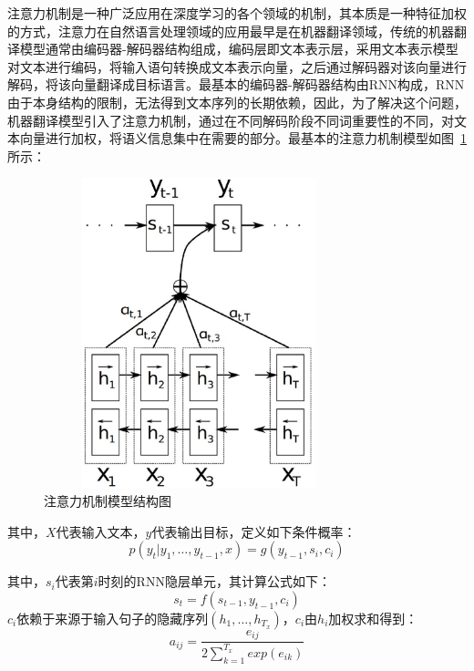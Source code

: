 注意力机制是一种广泛应用在深度学习的各个领域的机制，其本质是一种特征加权的方式，注意力在自然语言处理领域的应用最早是在机器翻译领域\cite{bahdanau2014neural}，传统的机器翻译模型通常由编码器-解码器结构组成，编码层即文本表示层，采用文本表示模型对文本进行编码，将输入语句转换成文本表示向量，之后通过解码器对该向量进行解码，将该向量翻译成目标语言。最基本的编码器-解码器结构由RNN构成，RNN由于本身结构的限制，无法得到文本序列的长期依赖，因此，为了解决这个问题，机器翻译模型引入了注意力机制，通过在不同解码阶段不同词重要性的不同，对文本向量进行加权，将语义信息集中在需要的部分。最基本的注意力机制模型如图~\ref{fig:attention}所示：
\begin{figure}[htb]
    \centering
    \includegraphics[width=9cm,height=9cm, clip=true]{./sources/rel_attention.eps}
    \vspace{-10pt}
    \caption{\label{fig:attention} 注意力机制模型结构图}
    \vspace{-5pt}
\end{figure}

其中，$X$代表输入文本，$y$代表输出目标，定义如下条件概率：
\begin{equation}
    p(y_t|y_1, \dots, y_{t-1},x) = g(y_{t-1},s_i,c_i)
\end{equation}

其中，$s_i$代表第$i$时刻的RNN隐层单元，其计算公式如下：
\begin{equation}
    s_t= f(s_{t-1},y_{t-1},c_i)
\end{equation}
$c_i$依赖于来源于输入句子的隐藏序列$(h_1,\dots,h_{T_x})$，$c_i$由$h_i$加权求和得到：
\begin{equation}
a_{ij} = \frac{e_{ij}}{2\sum_{k=1}^{T_x}exp(e_{ik})}
\end{equation}

